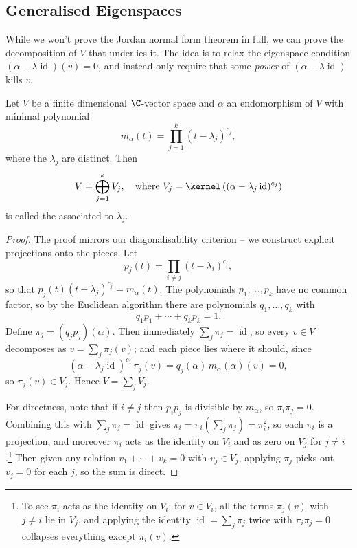 \subsection{Generalised Eigenspaces}

While we won't prove the Jordan normal form theorem in full, we can prove the decomposition of $V$ that underlies it. The idea is to relax the eigenspace condition $(\alpha - \lambda \operatorname{id})(v) = 0$, and instead only require that some \emph{power} of $(\alpha - \lambda\operatorname{id})$ kills $v$.

\begin{theorem}
    Let $V$ be a finite dimensional $\C$-vector space and $\alpha$ an endomorphism of $V$ with minimal polynomial
    $$
    m_\alpha(t) = \prod_{j = 1}^k (t - \lambda_j)^{c_j},
    $$
    where the $\lambda_j$ are distinct. Then
    $$
    V = \bigoplus_{j = 1}^k V_j, \quad \text{where } V_j = \kernel\left((\alpha - \lambda_j\operatorname{id})^{c_j}\right)
    $$
    is called the  associated to $\lambda_j$.
\end{theorem}
\begin{proof}
    The proof mirrors our diagonalisability criterion -- we construct explicit projections onto the pieces. Let
    $$
    p_j(t) = \prod_{i \neq j}(t - \lambda_i)^{c_i},
    $$
    so that $p_j (t)(t - \lambda_j)^{c_j} = m_\alpha(t)$. The polynomials $p_1, \dots, p_k$ have no common factor, so by the Euclidean algorithm there are polynomials $q_1, \dots, q_k$ with
    $$
    q_1 p_1 + \cdots + q_k p_k = 1.
    $$
    Define $\pi_j = (q_j p_j)(\alpha)$. Then immediately $\sum_j \pi_j = \operatorname{id}$, so every $v \in V$ decomposes as $v = \sum_j \pi_j(v)$; and each piece lies where it should, since
    $$
    (\alpha - \lambda_j \operatorname{id})^{c_j}\, \pi_j(v) = q_j(\alpha)\, m_\alpha(\alpha)(v) = 0,
    $$
    so $\pi_j(v) \in V_j$. Hence $V = \sum_j V_j$.

    For directness, note that if $i \neq j$ then $p_i p_j$ is divisible by $m_\alpha$, so $\pi_i \pi_j = 0$. Combining this with $\sum_j \pi_j = \operatorname{id}$ gives $\pi_i = \pi_i \left(\sum_j \pi_j\right) = \pi_i^2$, so each $\pi_i$ is a projection, and moreover $\pi_i$ acts as the identity on $V_i$ and as zero on $V_j$ for $j \neq i$.\footnote{To see $\pi_i$ acts as the identity on $V_i$: for $v \in V_i$, all the terms $\pi_j (v)$ with $j \neq i$ lie in $V_j$, and applying the identity $\operatorname{id} = \sum_j \pi_j$ twice with $\pi_i\pi_j = 0$ collapses everything except $\pi_i(v)$.} Then given any relation $v_1 + \cdots + v_k = 0$ with $v_j \in V_j$, applying $\pi_j$ picks out $v_j = 0$ for each $j$, so the sum is direct.
\end{proof}

